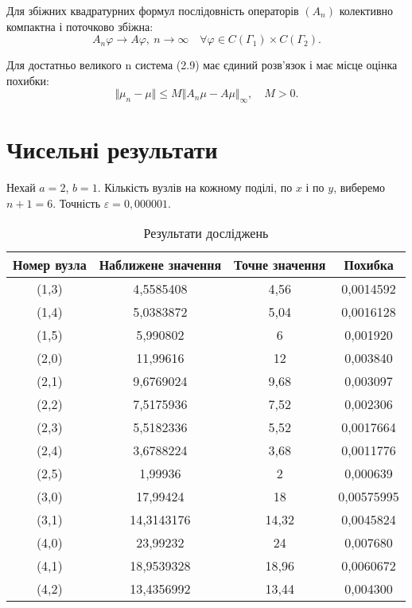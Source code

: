 \documentclass[10pt]{beamer}
\begin{document}
\begin{frame}
Для збіжних квадратурних формул послідовність операторів $(A_{n})$ колективно компактна і поточково збіжна:
\begin{equation*}
A_{n}\varphi\rightarrow A\varphi, \ n\to\infty \quad \forall\varphi\in C(\Gamma_{1})\times C(\Gamma_{2}).
\end{equation*}


\end{frame}


\begin{frame}
Для достатньо великого n система (2.9) має єдиний розв'язок і має місце оцінка похибки:
\begin{equation*}
\Vert\mu_{n}-\mu\Vert\le M\Vert A_{n}\mu-A\mu\Vert_{\infty}, \quad M>0.
\end{equation*}
\end{frame}
\section{Чисельні результати}
\begin{frame}
Нехай $a=2$, $b=1$. Кількість вузлів на кожному поділі, по $x$ і по $y$, виберемо $n+1 = 6$. Точність $\varepsilon = 0,000001$.
\begin{table}[h]
\caption{Результати досліджень}
\begin{center}
\begin{tabular}{|c|c|c|c|}
\hline
Номер вузла & Наближене значення&Точне значення& Похибка \\
\hline
(1,3)&4,5585408 &4,56&0,0014592\\
(1,4)&5,0383872 &5,04&0,0016128\\
(1,5)&5,990802 &6&0,001920\\
(2,0)&11,99616 &12&0,003840\\
(2,1)&9,6769024 &9,68&0,003097\\
(2,2)&7,5175936 &7,52&0,002306\\
(2,3)&5,5182336 &5,52&0,0017664\\
(2,4)&3,6788224 &3,68&0,0011776\\
(2,5)&1,99936 &2&0,000639\\
(3,0)&17,99424 &18&0,00575995\\
(3,1)&14,3143176 &14,32&0,0045824\\
(4,0)&23,99232 &24&0,007680\\
(4,1)&18,9539328 &18,96&0,0060672\\
(4,2)&13,4356992 &13,44&0,004300\\
\hline
\end{tabular}
\end{center}
\end{table}
\end{frame}
\end{document}
